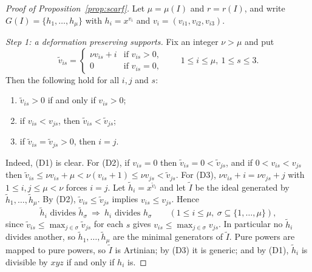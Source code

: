 \documentclass{amsart}
\theoremstyle{definition}
\theoremstyle{remark}
\numberwithin{equation}{section}
\begin{document}
\begin{proof}[Proof of Proposition~\textup{\ref{prop:scarf}}]
Let $\mu=\mu(I)$ and $r=r(I)$, and write $G(I)=\{h_1,\dots,h_\mu\}$ with $h_i=x^{v_i}$ and $v_i=(v_{i1},v_{i2},v_{i3})$.

\emph{Step 1: a deformation preserving supports.} Fix an integer $\nu>\mu$ and put
\[
\tilde v_{is}=\begin{cases} \nu v_{is}+i & \text{if } v_{is}>0,\\ 0 & \text{if } v_{is}=0,\end{cases}\qquad 1\le i\le\mu,\ 1\le s\le3 .
\]
Then the following hold for all $i,j$ and $s$:
\begin{enumerate}[(D1)]
\item $\tilde v_{is}>0$ if and only if $v_{is}>0$;
\item if $v_{is}<v_{js}$, then $\tilde v_{is}<\tilde v_{js}$;
\item if $\tilde v_{is}=\tilde v_{js}>0$, then $i=j$.
\end{enumerate}
Indeed, (D1) is clear. For (D2), if $v_{is}=0$ then $\tilde v_{is}=0<\tilde v_{js}$, and if $0<v_{is}<v_{js}$ then $\tilde v_{is}\le \nu v_{is}+\mu<\nu(v_{is}+1)\le \nu v_{js}<\tilde v_{js}$. For (D3), $\nu v_{is}+i=\nu v_{js}+j$ with $1\le i,j\le\mu<\nu$ forces $i=j$. Let $\tilde h_i=x^{\tilde v_i}$ and let $\tilde I$ be the ideal generated by $\tilde h_1,\dots,\tilde h_\mu$. By (D2), $\tilde v_{is}\le\tilde v_{js}$ implies $v_{is}\le v_{js}$. Hence
\begin{equation}\label{eq:divides}
\tilde h_i \text{ divides } \tilde h_\sigma\ \Longrightarrow\ h_i \text{ divides } h_\sigma \qquad (1\le i\le\mu,\ \sigma\subseteq\{1,\dots,\mu\}),
\end{equation}
since $\tilde v_{is}\le\max_{j\in\sigma}\tilde v_{js}$ for each $s$ gives $v_{is}\le\max_{j\in\sigma}v_{js}$. In particular no $\tilde h_i$ divides another, so $\tilde h_1,\dots,\tilde h_\mu$ are the minimal generators of $\tilde I$. Pure powers are mapped to pure powers, so $\tilde I$ is Artinian; by (D3) it is generic; and by (D1), $\tilde h_i$ is divisible by $xyz$ if and only if $h_i$ is.


\end{proof}
\end{document}
